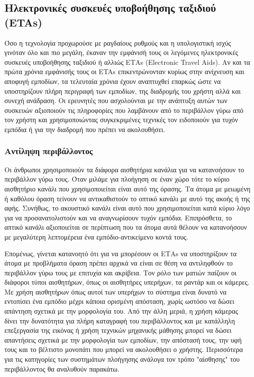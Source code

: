 \subsection{Ηλεκτρονικές συσκευές υποβοήθησης ταξιδιού (ETAs)}
Όσο η τεχνολογία προχωρούσε με ραγδαίους ρυθμούς και η υπολογιστική ισχύς γινόταν όλο και πιο μεγάλη, έκαναν την εμφάνισή τους οι λεγόμενες ηλεκτρονικές συσκευές υποβοήθησης ταξιδιού ή αλλιώς ΕΤΑs (Electronic Travel Aids). Αν και τα πρώτα χρόνια εμφάνισής τους οι ETAs επικεντρώνονταν κυρίως στην ανίχνευση και αποφυγή εμποδίων, τα τελευταία χρόνια έχουν αναπτυχθεί επαρκώς ώστε να υποστηρίζουν πλήρη περιγραφή των εμποδίων, της διαδρομής του χρήστη αλλά και συνεχή ανάδραση. Οι ερευνητές που ασχολούνται με την ανάπτυξη αυτών των συσκευών αξιοποιούν τις πληροφορίες που λαμβάνουν από το περιβάλλον γύρω από τον χρήστη και χρησιμοποιώντας συγκεκριμένες τεχνικές τον ειδοποιούν για τυχόν εμπόδια ή για την διαδρομή που πρέπει να ακολουθήσει.
\subsubsection{Αντίληψη περιβάλλοντος}
Οι άνθρωποι χρησιμοποιούν τα διάφορα αισθητήρια κανάλια για να κατανοήσουν το περιβάλλον γύρω τους. Όταν μιλάμε για πλοήγηση σε έναν χώρο τότε το κύριο αισθητήριο κανάλι που χρησιμοποιείται είναι αυτό της όρασης. Τα άτομα με μειωμένη ή καθόλου όραση τείνουν να αντικαθιστούν το οπτικό κανάλι με αυτό της ακοής ή της αφής. Συνήθως, το ακουστικό κανάλι είναι αυτό που χρησιμοποιείται κατά κύριο λόγο για να προσανατολιστούν και να αναγνωρίσουν τυχόν εμπόδια. Επιπρόσθετα, το απτικό κανάλι αξιοποιείται σε περίπτωση που τα άτομα αυτά θέλουν να κατανοήσουν με μεγαλύτερη λεπτομέρεια ένα εμπόδιο-αντικείμενο κοντά τους.

Επομένως, γίνεται κατανοητό ότι για να μπορέσουν οι ΕΤΑs να υποστηρίξουν τα άτομα με προβλήματα όραση πρέπει αρχικά να είναι σε θέση να αντιληφθούν το περιβάλλον γύρω τους με επιτυχία και ακρίβεια. Τον ρόλο των ματιών παίζουν οι διάφοροι τύποι αισθητήρων, όπως οι αισθητήρες υπερήχων, τα ραντάρ και οι κάμερες. Με χρήση αισθητήρων όπως αυτοί των υπερήχων το σύστημα είναι δυνατό να εντοπίσει ένα εμπόδιο μέχρι κάποια ορισμένη απόσταση, χωρίς ωστόσο να δώσει απάντηση σχετικά με την μορφολογία του. Από την άλλη μεριά, η χρήση κάμερας δίνει την δυνατότητα για πλήρη καταγραφή του περιβάλλοντος και με κατάλληλη επεξεργασία της εικόνας ή χρήση τεχνικών μηχανικής μάθησης μπορεί να δώσει απαντήσεις σχετικά με την μορφολογία των εμποδίων, την απόστασή τους, την υφή τους και το βέλτιστο μονοπάτι που μπορεί να ακολουθήσει ο χρήστης. Περισσότερα για τις κατηγορίες των συστημάτων πλοήγησης ανάλογα τον τρόπο "αίσθησης" του περιβάλλοντος θα αναλυθούν παρακάτω.
